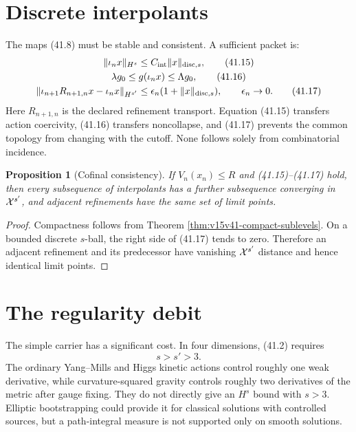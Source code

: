 \documentclass[11pt]{article}
\newtheorem{proposition}[theorem]{Proposition}
\theoremstyle{remark}
\begin{document}
\section{Discrete interpolants}

The maps (41.8) must be stable and consistent.  A sufficient packet
is:
\[
\begin{gathered}
\|\iota_nx\|_{H^s}\leq
C_{\rm int}\|x\|_{{\rm disc},s},                         \tag{41.15}\\
\lambda g_0\leq g(\iota_nx)\leq\Lambda g_0,              \tag{41.16}\\
\|\iota_{n+1}R_{n+1,n}x-\iota_nx\|_{H^{s'}}
\leq\epsilon_n(1+\|x\|_{{\rm disc},s}),
\qquad\epsilon_n\to0.                                   \tag{41.17}
\end{gathered}
\]
Here \(R_{n+1,n}\) is the declared refinement transport.  Equation
(41.15) transfers action coercivity, (41.16) transfers
noncollapse, and (41.17) prevents the common topology from changing
with the cutoff.  None follows solely from combinatorial incidence.

\begin{proposition}[Cofinal consistency]
\label{prop:v15v41-cofinal}
If \(V_n(x_n)\leq R\) and (41.15)--(41.17) hold, then every
subsequence of interpolants has a further subsequence converging in
\({\cal X}^{s'}\), and adjacent refinements have the same set of
limit points.
\end{proposition}

\begin{proof}
Compactness follows from Theorem
\ref{thm:v15v41-compact-sublevels}.  On a bounded discrete
\(s\)-ball, the right side of (41.17) tends to zero.  Therefore an
adjacent refinement and its predecessor have vanishing
\({\cal X}^{s'}\) distance and hence identical limit points.
\end{proof}

\section{The regularity debit}

The simple carrier has a significant cost.  In four dimensions,
(41.2) requires
\[
 s>s'>3.                                                 \tag{41.18}
\]
The ordinary Yang--Mills and Higgs kinetic actions control roughly
one weak derivative, while curvature-squared gravity controls
roughly two derivatives of the metric after gauge fixing.  They do
not directly give an \(H^s\) bound with \(s>3\).  Elliptic
bootstrapping could provide it for classical solutions with
controlled sources, but a path-integral measure is not supported
only on smooth solutions.
\end{document}
